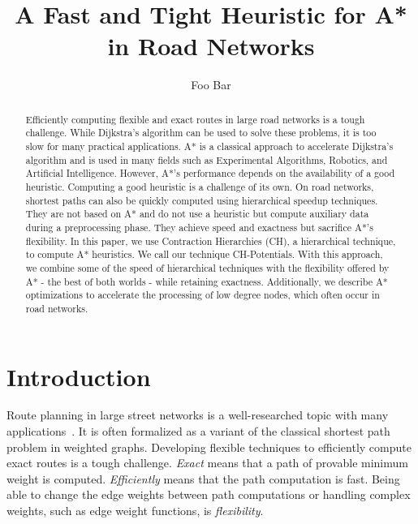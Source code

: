 \documentclass[letterpaper]{article} %
\title{A Fast and Tight Heuristic for A* in Road Networks}
\author{Foo Bar}
\begin{document}
\maketitle


\begin{abstract}
Efficiently computing flexible and exact routes in large road networks is a tough challenge.
While Dijkstra's algorithm can be used to solve these problems, it is too slow for many practical applications.
A* is a classical approach to accelerate Dijkstra's algorithm and is used in many fields such as Experimental Algorithms, Robotics, and Artificial Intelligence.
However, A*'s performance depends on the availability of a good heuristic.
Computing a good heuristic is a challenge of its own.
On road networks, shortest paths can also be quickly computed using hierarchical speedup techniques.
They are not based on A* and do not use a heuristic but compute auxiliary data during a preprocessing phase.
They achieve speed and exactness but sacrifice A*'s flexibility.
In this paper, we use Contraction Hierarchies (CH), a hierarchical technique, to compute A* heuristics.
We call our technique CH-Potentials.
With this approach, we combine some of the speed of hierarchical techniques with the flexibility offered by A* - the best of both worlds - while retaining exactness.
Additionally, we describe A* optimizations to accelerate the processing of low degree nodes, which often occur in road networks.
\end{abstract}

\section{Introduction}
\label{sec:intro}
Route planning in large street networks is a well-researched topic with many applications~\cite{bdgmpsww-rptn-16}.
It is often formalized as a variant of the classical shortest path problem in weighted graphs.
Developing flexible techniques to efficiently compute exact routes is a tough challenge.
\emph{Exact} means that a path of provable minimum weight is computed.
\emph{Efficiently} means that the path computation is fast.
Being able to change the edge weights between path computations or handling complex weights, such as edge weight functions, is \emph{flexibility}. %
\end{document}
